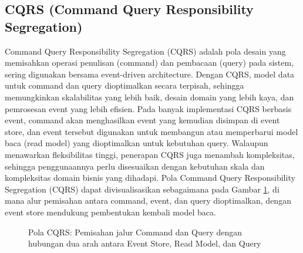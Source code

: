 \subsection{CQRS (Command Query Responsibility Segregation)}
Command Query Responsibility Segregation (CQRS) adalah pola desain yang memisahkan operasi penulisan (command) dan pembacaan (query) pada sistem, sering digunakan bersama event-driven architecture. Dengan CQRS, model data untuk command dan query dioptimalkan secara terpisah, sehingga memungkinkan skalabilitas yang lebih baik, desain domain yang lebih kaya, dan pemrosesan event yang lebih efisien. Pada banyak implementasi CQRS berbasis event, command akan menghasilkan event yang kemudian disimpan di event store, dan event tersebut digunakan untuk membangun atau memperbarui model baca (read model) yang dioptimalkan untuk kebutuhan query. Walaupun menawarkan fleksibilitas tinggi, penerapan CQRS juga menambah kompleksitas, sehingga penggunaannya perlu disesuaikan dengan kebutuhan skala dan kompleksitas domain bisnis yang dihadapi. Pola Command Query Responsibility Segregation (CQRS) dapat divisualisasikan sebagaimana pada Gambar \ref{fig:cqrs}, di mana alur pemisahan antara command, event, dan query dioptimalkan, dengan event store mendukung pembentukan kembali model baca.

\begin{figure}[h]
	\centering
	\caption{Pola CQRS: Pemisahan jalur Command dan Query dengan hubungan dua arah antara Event Store, Read Model, dan Query}
	\label{fig:cqrs}
\end{figure}




